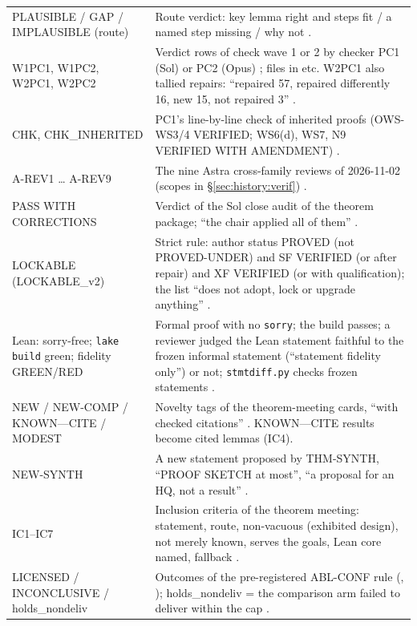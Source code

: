 {\begin{xltabular}{\textwidth}{@{}>{\raggedright\arraybackslash}p{4.4cm}>{\raggedright\arraybackslash}X@{}}
PLAUSIBLE / GAP / IMPLAUSIBLE (route) & Route verdict: key lemma right and steps fit / a named step missing / why not . \\
W1PC1, W1PC2, W2PC1, W2PC2 & Verdict rows of check wave 1 or 2 by checker PC1 (Sol) or PC2 (Opus) ; files in  etc. W2PC1 also tallied repairs: ``repaired 57, repaired differently 16, new 15, not repaired 3'' . \\
CHK, CHK\_INHERITED & PC1's line-by-line check of inherited proofs (OWS-WS3/4 VERIFIED; WS6(d), WS7, N9 VERIFIED WITH AMENDMENT) . \\
A-REV1 … A-REV9 & The nine Astra cross-family reviews of 2026-11-02 (scopes in \S\ref{sec:history:verif}) . \\
PASS WITH CORRECTIONS & Verdict of the Sol close audit of the theorem package; ``the chair applied all of them'' . \\
LOCKABLE (LOCKABLE\_v2) & Strict rule: author status PROVED (not PROVED-UNDER) and SF VERIFIED (or after repair) and XF VERIFIED (or with qualification); the list ``does not adopt, lock or upgrade anything'' . \\
Lean: sorry-free; \texttt{lake build} green; fidelity GREEN/RED & Formal proof with no \texttt{sorry}; the build passes; a reviewer judged the Lean statement faithful to the frozen informal statement (``statement fidelity only'') or not; \texttt{stmtdiff.py} checks frozen statements . \\
NEW / NEW-COMP / KNOWN—CITE / MODEST & Novelty tags of the theorem-meeting cards, ``with checked citations'' . KNOWN—CITE results become cited lemmas (IC4). \\
NEW-SYNTH & A new statement proposed by THM-SYNTH, ``PROOF SKETCH at most'', ``a proposal for an HQ, not a result'' . \\
IC1--IC7 & Inclusion criteria of the theorem meeting: statement, route, non-vacuous (exhibited design), not merely known, serves the goals, Lean core named, fallback . \\
LICENSED / INCONCLUSIVE / holds\_nondeliv & Outcomes of the pre-registered ABL-CONF rule (, ); holds\_nondeliv = the comparison arm failed to deliver within the cap . \\

\end{xltabular}}
